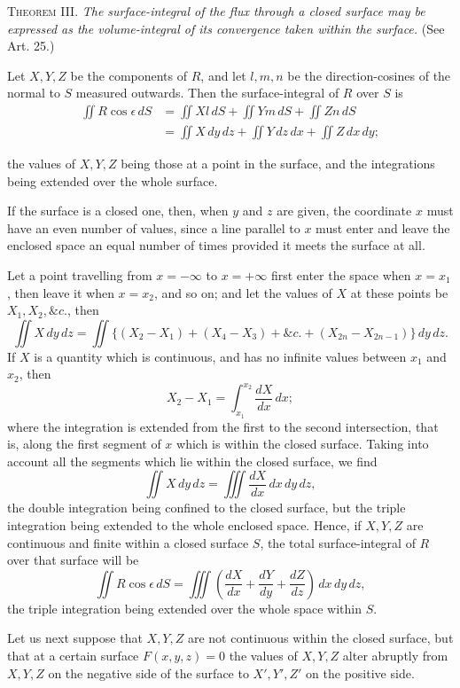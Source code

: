 \documentclass[11pt,a4paper]{article}
\begin{document}
\textsc{Theorem III.} \textit{The surface-integral of the flux through a
closed surface may be expressed as the volume-integral of its
convergence taken within the surface.} (See Art. 25.)

Let \(X,Y,Z\) be the components of \(R\), and let \(l,m,n\) be the
direction-cosines of the normal to \(S\) measured outwards. Then the
surface-integral of \(R\) over \(S\) is
\[
\begin{aligned}
\iint R\cos\epsilon\,dS
&=\iint Xl\,dS+\iint Ym\,dS+\iint Zn\,dS\\
&=\iint X\,dy\,dz+\iint Y\,dz\,dx+\iint Z\,dx\,dy;
\end{aligned}
\tag{1}
\]

\clearpage

the values of \(X,Y,Z\) being those at a point in the surface, and the
integrations being extended over the whole surface.

If the surface is a closed one, then, when \(y\) and \(z\) are given,
the coordinate \(x\) must have an even number of values, since a line
parallel to \(x\) must enter and leave the enclosed space an equal
number of times provided it meets the surface at all.

Let a point travelling from \(x=-\infty\) to \(x=+\infty\) first enter
the space when \(x=x_1\), then leave it when \(x=x_2\), and so on; and
let the values of \(X\) at these points be \(X_1,X_2,\&c.\), then
\[
\iint X\,dy\,dz
=\iint\{(X_2-X_1)+(X_4-X_3)+\&c.+(X_{2n}-X_{2n-1})\}\,dy\,dz.
\tag{2}
\]
If \(X\) is a quantity which is continuous, and has no infinite values
between \(x_1\) and \(x_2\), then
\[
X_2-X_1=\int_{x_1}^{x_2}\frac{dX}{dx}\,dx;
\tag{3}
\]
where the integration is extended from the first to the second
intersection, that is, along the first segment of \(x\) which is within
the closed surface. Taking into account all the segments which lie
within the closed surface, we find
\[
\iint X\,dy\,dz=\iiint\frac{dX}{dx}\,dx\,dy\,dz,
\tag{4}
\]
the double integration being confined to the closed surface, but the
triple integration being extended to the whole enclosed space. Hence, if
\(X,Y,Z\) are continuous and finite within a closed surface \(S\), the
total surface-integral of \(R\) over that surface will be
\[
\iint R\cos\epsilon\,dS
=\iiint\left(\frac{dX}{dx}+\frac{dY}{dy}+\frac{dZ}{dz}\right)\,dx\,dy\,dz,
\tag{5}
\]
the triple integration being extended over the whole space within \(S\).

Let us next suppose that \(X,Y,Z\) are not continuous within the closed
surface, but that at a certain surface \(F(x,y,z)=0\) the values of
\(X,Y,Z\) alter abruptly from \(X,Y,Z\) on the negative side of the
surface to \(X',Y',Z'\) on the positive side.
\end{document}
